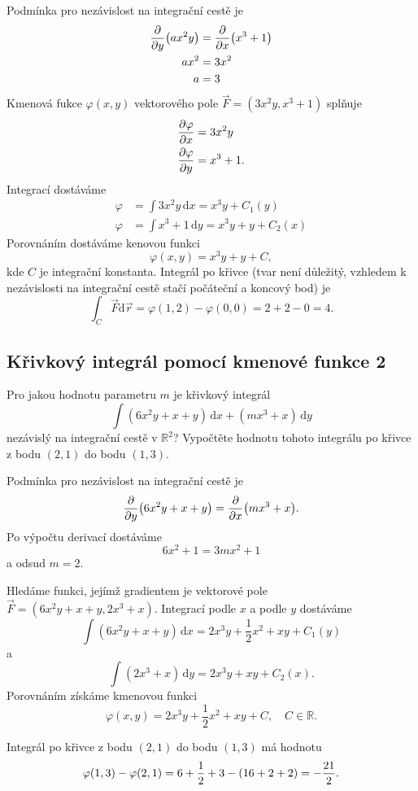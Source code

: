 \reseni

Podmínka pro nezávislost na integrační cestě je $$
\begin{aligned}
  \pdv{y}(ax^2y)&=\pdv{x}(x^3+1)\\
  ax^2&=3x^2\\
  a&=3
\end{aligned}
$$
Kmenová fukce $\varphi(x,y)$ vektorového pole $\vec F=(3x^2y,x^3+1)$ splňuje
$$
\begin{aligned}
  \pdv{\varphi}{x}&=3x^2y \\  \pdv{\varphi}{y}&=x^3+1.
\end{aligned}
$$
Integrací dostáváme
$$
\begin{aligned}
  \varphi &= \int 3x^2y\,\mathrm dx=x^3y+C_1(y)\\
  \varphi &= \int x^3+1\,\mathrm dy=x^3y+y+C_2(x)
\end{aligned}
$$
Porovnáním dostáváme kenovou funkci $$\varphi (x,y)=x^3y+y+C,$$ kde $C$ je integrační konstanta. Integrál po křivce (tvar není důležitý, vzhledem k nezávislosti na integrační cestě stačí počáteční a koncový bod) je
$$\int _C \vec F\mathrm d\vec r=\varphi(1,2)-\varphi(0,0)=2+2-0=4.$$


\konec

\subsection{Křivkový integrál pomocí kmenové funkce 2}

Pro jakou hodnotu parametru $m$ je křivkový integrál
$$\int (6x^2y+x+y)\,\mathrm dx+(mx^3+x)\,\mathrm dy$$ nezávislý na
integrační cestě v $\mathbb R^2$? Vypočtěte hodnotu tohoto integrálu
po křivce z bodu $(2,1)$ do bodu $(1,3)$.

\reseni

Podmínka pro nezávislost na integrační cestě je $$\pdv{y}\qty(6x^2y+x+y)=\pdv{x}\qty(mx^3+x).$$
Po výpočtu derivací dostáváme
$$6x^2+1=3mx^2+1$$
a odsud $m=2$.

Hledáme funkci, jejímž gradientem je vektorové pole $\vec F=(6x^2y+x+y,2x^3+x)$. 
Integrací podle $x$ a podle $y$ dostáváme
$$\int (6x^2y+x+y)\,\mathrm dx= 2x^3y+\frac 12 x^2+xy+C_1(y) $$
a
$$\int (2x^3+x)\,\mathrm dy=2x^3y+xy+C_2(x).$$
Porovnáním získáme kmenovou funkci
$$\varphi(x,y)=2x^3y+\frac 12 x^2+xy+C,
\quad C
\in
\mathbb R.$$

Integrál po křivce  z bodu $(2,1)$ do bodu $(1,3)$
má hodnotu
$$\varphi(1,3)-\varphi(2,1)=6+\frac 12 +3-\qty(16+2+2)=-\frac{21}2.$$

